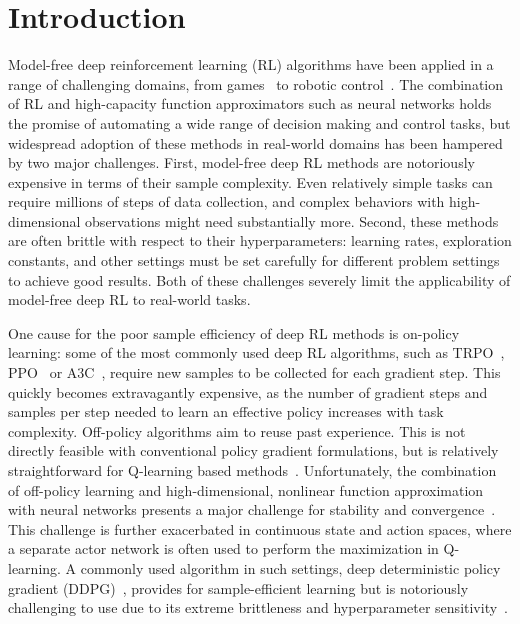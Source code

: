 \documentclass{article}
\begin{document}
\section{Introduction}

Model-free deep reinforcement learning (RL) algorithms have been applied in a range of challenging domains, from games~\citep{mnih2013playing,silver2016mastering} to robotic control~\citep{schulman2015trust}. The combination of RL and high-capacity function approximators such as neural networks holds the promise of automating a wide range of decision making and control tasks, but widespread adoption of these methods in real-world domains has been hampered by two major challenges. First, model-free deep RL methods are notoriously expensive in terms of their sample complexity. Even relatively simple tasks can require millions of steps of data collection, and complex behaviors with high-dimensional observations might need substantially more. Second, these methods are often brittle with respect to their hyperparameters: learning rates, exploration constants, and other settings must be set carefully for different problem settings to achieve good results. Both of these challenges severely limit the applicability of model-free deep RL to real-world tasks.

One cause for the poor sample efficiency of deep RL methods is on-policy learning: some of the most commonly used deep RL algorithms, such as TRPO~\cite{schulman2015trust}, PPO~\citep{schulman2017proximal} or A3C~\citep{mnih2016asynchronous}, require new samples to be collected for each gradient step. This quickly becomes extravagantly expensive, as the number of gradient steps and samples per step needed to learn an effective policy increases with task complexity. Off-policy algorithms aim to reuse past experience. This is not directly feasible with conventional policy gradient formulations, but is relatively straightforward for Q-learning based methods~\citep{mnih2015human}. Unfortunately, the combination of off-policy learning and high-dimensional, nonlinear function approximation with neural networks presents a major challenge for stability and convergence~\citep{bhatnagar2009convergent}.
This challenge is further exacerbated in continuous state and action spaces, where a separate actor network is often used to perform the maximization in Q-learning. A commonly used algorithm in such settings, deep deterministic policy gradient (DDPG)~\citep{lillicrap2015continuous}, provides for sample-efficient learning but is notoriously challenging to use due to its extreme brittleness and hyperparameter sensitivity~\citep{duan2016benchmarking,henderson2017deep}.
\end{document}
